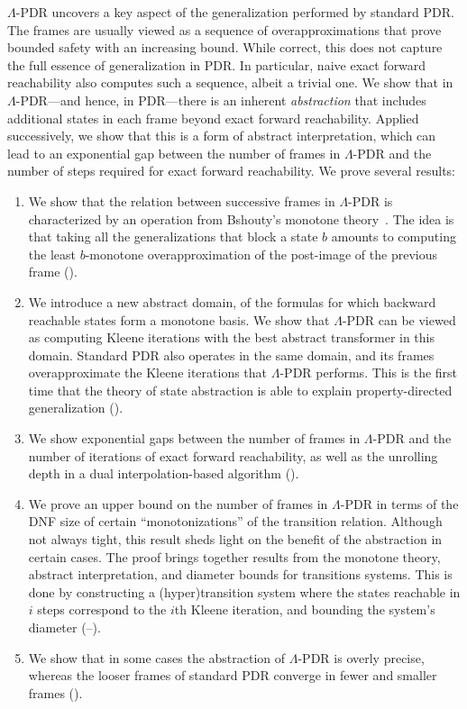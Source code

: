 \documentclass[acmsmall,screen]{acmart}
\begin{document}
%
$\Lambda$-PDR uncovers a key aspect of the generalization performed by standard PDR. The frames are usually viewed as a sequence of overapproximations that prove bounded safety with an increasing bound. While correct, this does not capture the full essence of generalization in PDR. In particular, naive exact forward reachability also computes such a sequence, albeit a trivial one.
We show that in $\Lambda$-PDR---and hence, in PDR---there is an inherent \emph{abstraction} that includes additional states in each frame beyond exact forward reachability. Applied successively, we show that this is a form of abstract interpretation,
%
%
which can lead to an exponential gap between the number of frames in $\Lambda$-PDR and the number of steps required for exact forward reachability.
%
%
We prove several results:
\begin{enumerate}

	\item We show that the relation between successive frames in $\Lambda$-PDR is characterized by an operation from Bshouty's monotone theory~\cite{DBLP:journals/iandc/Bshouty95}. The idea is that taking all the generalizations that block a state $b$ amounts to computing the least $b$-monotone overapproximation of the post-image of the previous frame ().

	\item We introduce a new abstract domain, of the formulas for which backward reachable states form a monotone basis. %
	We show that $\Lambda$-PDR can be viewed as computing Kleene iterations with the best abstract transformer in this domain.
	Standard PDR also operates in the same domain, and its frames overapproximate the Kleene iterations that $\Lambda$-PDR performs.
	This is the first time that the theory of state abstraction is able to explain property-directed generalization ().

	\item We show exponential gaps between the number of frames in $\Lambda$-PDR and the number of iterations of exact forward reachability, as well as the unrolling depth in a dual interpolation-based algorithm ().

%
%
%
%

	\item We prove an upper bound on the number of frames in $\Lambda$-PDR in terms of the DNF size of certain ``monotonizations'' of the transition relation. Although not always tight, this result sheds light on the benefit of the abstraction in certain cases. The proof brings together results from the monotone theory, abstract interpretation, and diameter bounds for transitions systems. This is done by  constructing a (hyper)transition system where the states reachable in $i$ steps correspond to the $i$th Kleene iteration, and bounding the system's diameter (--).

	\item We show that in some cases the abstraction of $\Lambda$-PDR is overly precise, whereas the looser frames of standard PDR converge in fewer and smaller frames ().
\end{enumerate}
\end{document}

